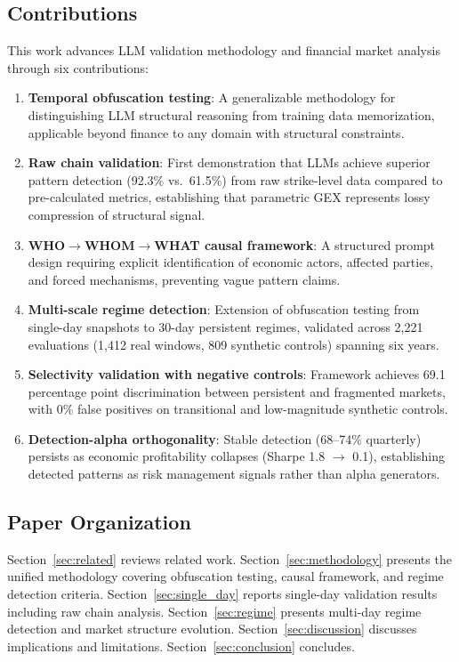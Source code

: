 \subsection{Contributions}

This work advances LLM validation methodology and financial market analysis through six contributions:

\begin{enumerate}
\item \textbf{Temporal obfuscation testing}: A generalizable methodology for distinguishing LLM structural reasoning from training data memorization, applicable beyond finance to any domain with structural constraints.

\item \textbf{Raw chain validation}: First demonstration that LLMs achieve superior pattern detection (92.3\% vs.\ 61.5\%) from raw strike-level data compared to pre-calculated metrics, establishing that parametric GEX represents lossy compression of structural signal.

\item \textbf{WHO$\rightarrow$WHOM$\rightarrow$WHAT causal framework}: A structured prompt design requiring explicit identification of economic actors, affected parties, and forced mechanisms, preventing vague pattern claims.

\item \textbf{Multi-scale regime detection}: Extension of obfuscation testing from single-day snapshots to 30-day persistent regimes, validated across 2,221 evaluations (1,412 real windows, 809 synthetic controls) spanning six years.

\item \textbf{Selectivity validation with negative controls}: Framework achieves 69.1 percentage point discrimination between persistent and fragmented markets, with 0\% false positives on transitional and low-magnitude synthetic controls.

\item \textbf{Detection-alpha orthogonality}: Stable detection (68--74\% quarterly) persists as economic profitability collapses (Sharpe 1.8 $\rightarrow$ 0.1), establishing detected patterns as risk management signals rather than alpha generators.
\end{enumerate}

\subsection{Paper Organization}

Section~\ref{sec:related} reviews related work. Section~\ref{sec:methodology} presents the unified methodology covering obfuscation testing, causal framework, and regime detection criteria. Section~\ref{sec:single_day} reports single-day validation results including raw chain analysis. Section~\ref{sec:regime} presents multi-day regime detection and market structure evolution. Section~\ref{sec:discussion} discusses implications and limitations. Section~\ref{sec:conclusion} concludes.
